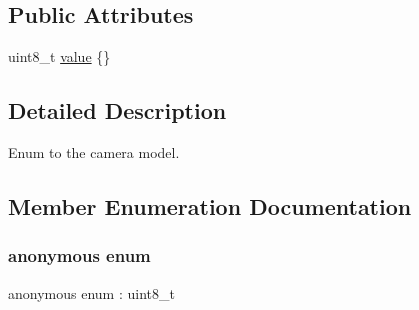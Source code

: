 \subsection*{Public Attributes}
\begin{DoxyCompactItemize}
\item 
uint8\+\_\+t \hyperlink{structmaf__perception__interface_1_1CameraModelEnum_ad10390a928053c9073e801d46bbfd55d}{value} \{\}
\end{DoxyCompactItemize}


\subsection{Detailed Description}
Enum to the camera model. 

\subsection{Member Enumeration Documentation}
\mbox{\label{structmaf__perception__interface_1_1CameraModelEnum_accb12c2cef4137e477e891decfedcd54}} 
\subsubsection{\texorpdfstring{anonymous enum}{anonymous enum}}
{\footnotesize\ttfamily anonymous enum \+: uint8\+\_\+t}

